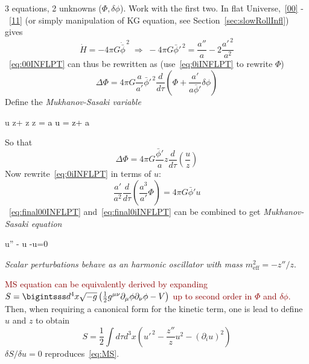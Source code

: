 3 equations, 2 unknowns ($\Phi,\delta \phi$). Work with the first two. In flat Universe,~\eqref{00} -~\eqref{11} (or simply manipulation of KG equation, see Section~\ref{sec:slowRollInfl}) gives 
\begin{equation}
    \dot{H} = -4\pi G \dot{\bar{\phi}}^{\,2} \; \Rightarrow \; -4\pi G\bar{\phi}'^{\,2} = \frac{a''}{a}-2\frac{a'^{\,2}}{a^2}
\end{equation}
~\eqref{eq:00INFLPT} can thus be rewritten as (use~\eqref{eq:0iINFLPT} to rewrite $\Phi$)
\begin{equation}
    \Delta \Phi = 4\pi G \frac{a}{a'}\bar{\phi}'^{\,2} \frac{d}{d \tau}\left(\Phi + \frac{a'}{a \bar{\phi}'}\delta \phi\right)
\end{equation}
Define the \textit{Mukhanov-Sasaki variable} 
%
\begin{eqopt}[darkgreen]
    u \equiv z\Phi + z \delta \phi \qquad z \equiv {}  \textcolor{black}{= \sqrt{2\epsilon} a \quad \Rightarrow \quad u = z\Phi + a\delta \phi}
\end{eqopt}
So that 
\begin{equation}\label{eq:final00INFLPT}
    \Delta \Phi = 4\pi G \frac{\bar{\phi}'}{a}z  \frac{d}{d \tau}\left(\frac{u}{z}\right)
\end{equation}
Now rewrite~\eqref{eq:0iINFLPT} in terms of $u$:
\begin{equation}\label{eq:final0iINFLPT}
   \frac{a'}{a^2} \frac{d}{d \tau}\left(\frac{a^3}{a'} \Phi\right) = 4 \pi G \bar{\phi}' u
\end{equation}
~\eqref{eq:final00INFLPT} and~\eqref{eq:final0iINFLPT} can be combined to get \textit{Mukhanov-Sasaki equation}
\begin{eqopt}\label{eq:MS}
    u'' - u -\Delta u=0
\end{eqopt} 
\emph{Scalar perturbations behave as an harmonic oscillator with mass $m^2_{\text{eff}} = -z''/z$}.

\textcolor{darkred}{MS equation can be equivalently derived by expanding $S= \bigintsss d^4x \sqrt{-g}\left(\frac{1}{2} g^{\mu\nu} \partial_\mu \phi \partial_\nu \phi - V\right)$ up to second order in $\Phi$ and $\delta \phi$.}
Then, when requiring a canonical form for the kinetic term, one is lead to define $u$ and $z$ to obtain 
\begin{equation}\label{eq:ScalarPTAction}
    S = \frac{1}{2}\int d\tau d^3x \left(  u'^{\,2} - \frac{z''}{z}u^2 -(\partial_i u)^2  \right)
\end{equation}
$\delta S / \delta u =0$ reproduces~\eqref{eq:MS}.

